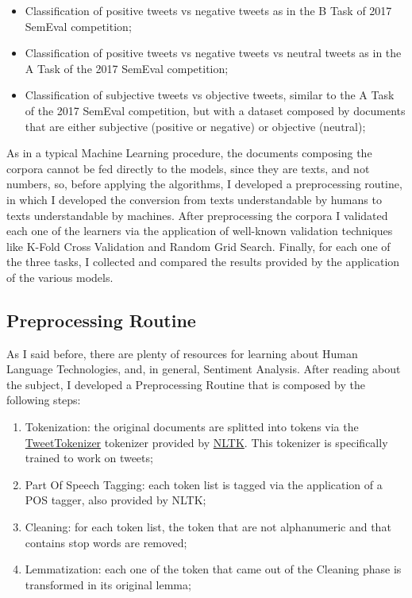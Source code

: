 \documentclass[11pt,twocolumn]{article}
\begin{document}
        \begin{itemize}
            \item Classification of positive tweets vs negative tweets as in the B Task of 2017 SemEval
            competition;
            \item Classification of positive tweets vs negative tweets vs neutral tweets as in the A Task of the
            2017 SemEval competition;
            \item Classification of subjective tweets vs objective tweets, similar to the A Task of the 2017
            SemEval competition, but with a dataset composed by documents that are either subjective
            (positive or negative) or objective (neutral);
        \end{itemize}

        \noindent
        As in a typical Machine Learning procedure, the documents composing the corpora cannot be fed directly to
        the models, since they are texts, and not numbers, so, before applying the algorithms, I developed a
        preprocessing routine, in which I developed the conversion from texts understandable by humans to texts
        understandable by machines. After preprocessing the corpora I validated each one of the learners via the
        application of well-known validation techniques like K-Fold Cross Validation and Random Grid Search.
        Finally, for each one of the three tasks, I collected and compared the results provided by the
        application of the various models.

        \subsection{Preprocessing Routine} %
        \label{sub:preprocessing_routine}
            As I said before, there are plenty of resources for learning about Human Language Technologies, and,
            in general, Sentiment Analysis. After reading about the subject, I developed a Preprocessing
            Routine that is composed by the following steps:

            \begin{enumerate}
                \item Tokenization: the original documents are splitted into tokens via the
                \href{https://www.nltk.org/api/nltk.tokenize.html#module-nltk.tokenize}{TweetTokenizer}
                tokenizer provided by \href{https://www.nltk.org/py-modindex.html}{NLTK}. This tokenizer is
                specifically trained to work on tweets;
                \item Part Of Speech Tagging: each token list is tagged via the application of a POS
                tagger, also provided by NLTK;
                \item Cleaning: for each token list, the token that are not alphanumeric and that contains
                stop words are removed;
                \item Lemmatization: each one of the token that came out of the Cleaning phase is transformed
                in its original lemma;
            \end{enumerate}
\end{document}
